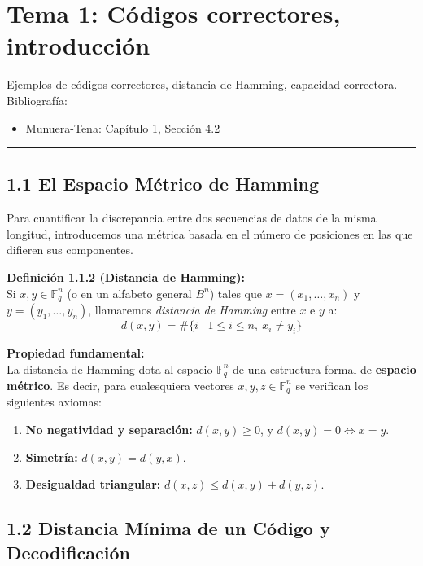 \documentclass{article}
\newcommand{\hlinecolor}{\noindent\textcolor{azuloscuro}{\rule{\textwidth}{1pt}}}
\begin{document}
 
\newpage %
 
\tableofcontents
\newpage
 

\section{Tema 1: Códigos correctores, introducción}
Ejemplos de códigos correctores, distancia de Hamming, capacidad correctora.\\
Bibliografía:
\begin{itemize}
\item Munuera-Tena: Capítulo 1, Sección 4.2
\end{itemize}
\hlinecolor{}

\subsection{1.1 El Espacio Métrico de Hamming}

Para cuantificar la discrepancia entre dos secuencias de datos de la misma longitud, introducemos una métrica basada en el número de posiciones en las que difieren sus componentes.

\textbf{Definición 1.1.2 (Distancia de Hamming):}\\
Si $x, y \in \mathbb{F}_q^n$ (o en un alfabeto general $B^n$) tales que $x = (x_1, \dots, x_n)$ y $y = (y_1, \dots, y_n)$, llamaremos \textit{distancia de Hamming} entre $x$ e $y$ a:
\[
d(x,y) = \#\{ i \mid 1 \leq i \leq n, \ x_i \neq y_i \}
\]

\textbf{Propiedad fundamental:}\\
La distancia de Hamming dota al espacio $\mathbb{F}_q^n$ de una estructura formal de \textbf{espacio métrico}. Es decir, para cualesquiera vectores $x, y, z \in \mathbb{F}_q^n$ se verifican los siguientes axiomas:
\begin{enumerate}
    \item \textbf{No negatividad y separación:} $d(x, y) \ge 0$, y $d(x, y) = 0 \iff x = y$.
    \item \textbf{Simetría:} $d(x, y) = d(y, x)$.
    \item \textbf{Desigualdad triangular:} $d(x, z) \le d(x, y) + d(y, z)$.
\end{enumerate}

\subsection{1.2 Distancia Mínima de un Código y Decodificación}
\end{document}
